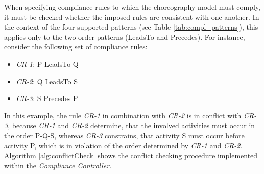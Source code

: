 When specifying compliance rules to which the choreography model must comply, it must be checked whether the imposed rules are consistent with one another. In the context of the four supported patterns (see Table \ref{tab:compl_patterns}), this applies only to the two order patterns (LeadsTo and Precedes). For instance, consider the following set of compliance rules:

\begin{itemize}
\item \textit{CR-1}: P LeadsTo Q
\item \textit{CR-2}: Q LeadsTo S
\item \textit{CR-3}: S Precedes P
\end{itemize}

In this example, the rule \textit{CR-1} in combination with \textit{CR-2} is in conflict with \textit{CR-3}, because \textit{CR-1} and \textit{CR-2} determine, that the involved activities must occur in the order P-Q-S, whereas \textit{CR-3} constrains, that activity S must occur before activity P, which is in violation of the order determined by \textit{CR-1} and \textit{CR-2}. Algorithm \ref{alg:conflictCheck} shows the conflict checking procedure implemented within the \textit{Compliance Controller}. \\

